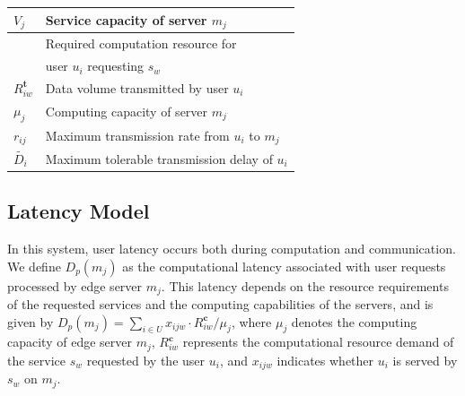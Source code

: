\documentclass[10pt, conference, letterpaper]{IEEEtran}
\begin{document}
\begin{table}[!t]
\begin{tabular}{|>{\centering\arraybackslash}m{2cm}|>{\raggedright\arraybackslash}m{6cm}|}
    $V_j$ & Service capacity of server $m_j$ \\ \hline
    \multirow{2}{*}{$R^{\textbf{c}}_{iw}$} & Required computation resource for \\ 
    & user $u_i$ requesting $s_w$ \\ \hline
    $R^{\textbf{t}}_{iw}$ & Data volume transmitted by user $u_i$ \\ \hline
    $\mu_j$ & Computing capacity of server $m_j$ \\ \hline
    $r_{ij}$ & Maximum transmission rate from $u_i$ to $m_j$ \\ \hline
    $\widetilde{D_i}$ & Maximum tolerable transmission delay of $u_i$ \\ \hline
\end{tabular}
\end{table}

\subsection{Latency Model}
In this system, user latency occurs both during computation and communication. We define $D_{p}(m_j)$ as the computational latency associated with user requests processed by edge server $m_j$. This latency depends on the resource requirements of the requested services and the computing capabilities of the servers, and is given by $D_{p}(m_j) = \sum_{i \in U} x_{ijw} \cdot {R^{\textbf{c}}_{iw}}/{\mu_j}$, where $\mu_j$ denotes the computing capacity of edge server $m_j$, $R^{\textbf{c}}_{iw}$ represents the computational resource demand of the service $s_w$ requested by the user $u_i$, and $x_{ijw}$ indicates whether $u_i$ is served by $s_w$ on $m_j$. 
\end{document}

